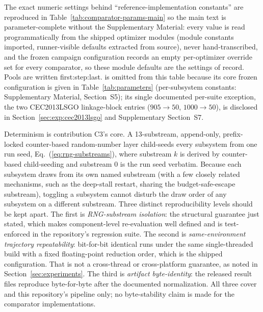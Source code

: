 The exact numeric settings behind ``reference-implementation constants'' are reproduced
in Table~\ref{tab:comparator-params-main} so the main text is
parameter-complete without the Supplementary Material: every value is
read programmatically from the shipped optimizer modules (module
constants imported, runner-visible defaults extracted from source),
never hand-transcribed, and the frozen campaign configuration records an
empty per-optimizer override set for every comparator, so these module
defaults are the settings of record. Pools are written first:step:last.
\dtgsk{} is omitted from this table because its core frozen
configuration is given in Table~\ref{tab:parameters} (per-subsystem
constants: Supplementary Material, Section~S5); its single
documented per-suite exception, the two CEC2013LSGO linkage-block
entries ($905 \to 50$, $1000 \to 50$), is disclosed in
Section~\ref{sec:exp:cec2013lsgo} and Supplementary Section~S7.
\begin{table}[H]
\caption{GSK-family comparator parameter settings exactly as run in this
study, read from the shipped optimizer modules. Identical settings apply
on all five suites; no comparator is tuned per suite. Bracketed lists are
per-arm pools; ranges are written first:step:last.}\label{tab:comparator-params-main}
\centering
\tablesize{\footnotesize}
\resizebox{\textwidth}{!}{}
\end{table}

Determinism is contribution C3's core.
A 13-substream, append-only, prefix-locked counter-based random-number
layer child-seeds every subsystem from one run seed,
Eq.~(\ref{eq:rng-substreams}), where substream $k$ is derived by
counter-based child-seeding and substream 0 is the run seed
verbatim. %
Because each subsystem draws from its own named substream (with a
few closely related mechanisms, such as the deep-stall restart, sharing
the budget-safe-escape substream), toggling a subsystem cannot
disturb the draw order of any subsystem on a different substream. Three
distinct reproducibility levels should be kept apart. The first is
\emph{RNG-substream isolation}: the structural guarantee just stated, which
makes component-level re-evaluation well defined and is test-enforced in the
repository's regression suite. The second is \emph{same-environment trajectory
repeatability}: bit-for-bit identical runs under the same single-threaded
build with a fixed floating-point reduction order, which is the shipped
configuration. That is not a cross-thread or cross-platform guarantee, as noted
in Section~\ref{sec:experiments}. The third is \emph{artifact byte-identity}:
the released result files reproduce byte-for-byte after the documented
normalization. All three cover \dtgsk{} and this repository's pipeline only;
no byte-stability claim is made for the comparator implementations.

